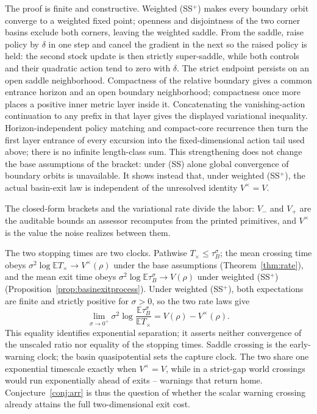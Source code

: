 \documentclass[11pt]{article}
\theoremstyle{definition}
\theoremstyle{remark}
\numberwithin{equation}{section}
\begin{document}
The proof is finite and constructive. Weighted (SS$^+$) makes every boundary orbit converge to a weighted fixed point; openness and disjointness of the two corner basins exclude both corners, leaving the weighted saddle. From the saddle, raise policy by $\delta$ in one step and cancel the gradient in the next so the raised policy is held: the second stock update is then strictly super-saddle, while both controls and their quadratic action tend to zero with $\delta$. The strict endpoint persists on an open saddle neighborhood. Compactness of the relative boundary gives a common entrance horizon and an open boundary neighborhood; compactness once more places a positive inner metric layer inside it. Concatenating the vanishing-action continuation to any prefix in that layer gives the displayed variational inequality. Horizon-independent policy matching and compact-core recurrence then turn the first layer entrance of every excursion into the fixed-dimensional action tail used above; there is no infinite length-class sum. This strengthening does not change the base assumptions of the bracket: under (SS) alone global convergence of boundary orbits is unavailable. It shows instead that, under weighted (SS$^+$), the actual basin-exit law is independent of the unresolved identity $V^\times=V$.

The closed-form brackets and the variational rate divide the labor: $V_-$ and $V_+$ are the auditable bounds an assessor recomputes from the printed primitives, and $V^{\times}$ is the value the noise realizes between them.

The two stopping times are two clocks. Pathwise $T_\times \le \tau_B^\sigma$; the mean crossing time obeys $\sigma^2\log\mathbb E T_\times \to V^{\times}(\rho)$ under the base assumptions (Theorem~\ref{thm:rate}), and the mean exit time obeys $\sigma^2\log\mathbb E\tau_B^\sigma \to V(\rho)$ under weighted (SS$^+$) (Proposition~\ref{prop:basinexitprocess}). Under weighted (SS$^+$), both expectations are finite and strictly positive for $\sigma>0$, so the two rate laws give
\[
\lim_{\sigma\to0^+}\sigma^2\log
\frac{\mathbb E\tau_B^\sigma}{\mathbb E T_\times}
= V(\rho)-V^{\times}(\rho).
\]
This equality identifies exponential separation; it asserts neither convergence of the unscaled ratio nor equality of the stopping times. Saddle crossing is the early-warning clock; the basin quasipotential sets the capture clock. The two share one exponential timescale exactly when $V^{\times}=V$, while in a strict-gap world crossings would run exponentially ahead of exits -- warnings that return home. Conjecture~\ref{conj:arr} is thus the question of whether the scalar warning crossing already attains the full two-dimensional exit cost.
\end{document}
